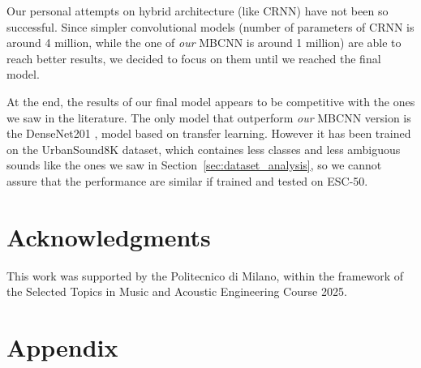 \documentclass{article}
\begin{document}
\begin{sloppy}
Our personal attempts on hybrid architecture (like CRNN) have not been so successful. Since simpler convolutional models
(number of parameters of CRNN is around 4 million, while the one of \textit{our} MBCNN is around 1 million)
are able to reach better results, we decided to focus on them until we reached the final model. 

At the end, the results of our final model appears to be competitive with
the ones we saw in the literature.
The only model that outperform \textit{our} MBCNN version is the DenseNet201 \cite{electronics11152279},
model based on transfer learning.
However it has been trained on the UrbanSound8K dataset, which containes less classes and
less ambiguous sounds like the ones we saw in Section~\ref{sec:dataset_analysis},
so we cannot assure that the performance are similar if trained and tested on ESC-50.


\section{Acknowledgments}
\label{sec:ack}
This work was supported by the Politecnico di Milano,
within the framework of the Selected Topics in Music and Acoustic Engineering Course 2025.
\newpage


\newpage
\section{Appendix}
\label{sec:Appendix}



\end{sloppy}
\end{document}
